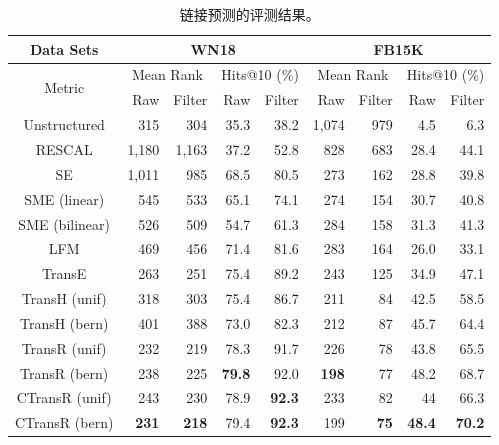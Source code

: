     \begin{table}[htb]
    \small
      \centering
      \caption{链接预测的评测结果。}
      \label{label_1:link_prediction}
      \begin{tabular}{|c|rr|rr|rr|rr|}
        \hline
        Data Sets & \multicolumn{4}{|c|}{WN18}&\multicolumn{4}{|c|}{FB15K}\\
        \hline
        
        \multirow{2}{*}{Metric} & \multicolumn{2}{|c|}{Mean Rank} & \multicolumn{2}{|c|}{Hits@10 ($\%$)} & \multicolumn{2}{|c|}{Mean Rank}& \multicolumn{2}{|c|}{Hits@10 ($\%$)} \\
        & Raw &Filter & Raw & Filter & Raw & Filter & Raw & Filter \\
        \hline
        Unstructured \cite{bordes2012joint}        &    315  &    304 & 35.3 & 38.2 & 1,074 & 979 &    4.5 &   6.3\\
        RESCAL \cite{nickel2011three}               & 1,180  & 1,163 & 37.2 & 52.8 &    828 & 683 &  28.4 & 44.1\\
        SE \cite{bordes2011learning}                  & 1,011  &    985 & 68.5 & 80.5 &    273 & 162 &  28.8 & 39.8\\
        SME (linear) \cite{bordes2012joint}         &    545  &    533 & 65.1 & 74.1 &    274 & 154 &  30.7 & 40.8\\
        SME (bilinear) \cite{bordes2012joint}      &    526  &    509 & 54.7 & 61.3 &    284 & 158 &  31.3 & 41.3\\
        LFM  \cite{jenatton2012latent}                 &    469  &   456 & 71.4 & 81.6 &    283 & 164 &  26.0 & 33.1\\
        TransE \cite{bordes2013translating}        &    263 &    251 & 75.4 & 89.2 &    243 & 125 &  34.9 & 47.1\\
        TransH (unif) \cite{wang2014knowledge} &   318 &    303 & 75.4 & 86.7 &    211 &    84 &  42.5 & 58.5\\
        TransH (bern) \cite{wang2014knowledge}&   401 &    388 & 73.0 & 82.3 &    212 &    87 & 45.7 & 64.4\\
         \hline
        TransR (unif)  &232 &219 &           78.3                &91.7&                226&            78 &            43.8 &           65.5\\
        TransR (bern) & 238             &225             &\textbf{79.8}  &92.0 &    \textbf{198}& 77 &  48.2 & 68.7 \\
     CTransR (unif) & 243 & 230& 78.9&\textbf{92.3} & 233&  82  &44&66.3\\
     CTransR (bern) & \textbf{231}            &\textbf{218}             &79.4  &\textbf{92.3} &   199  & \textbf{75} & \textbf{48.4} &\textbf{70.2} \\
        \hline
      \end{tabular}
    \end{table}

